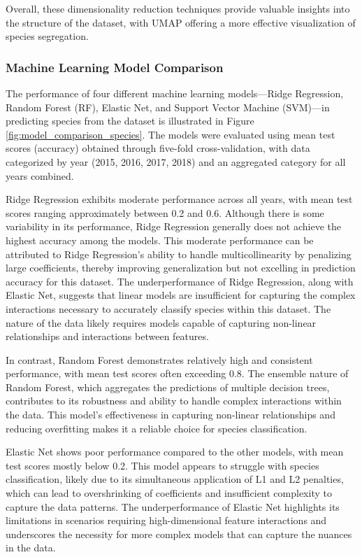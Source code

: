 \documentclass[english,11pt,a4paper,titlepage]{article}
\begin{document}
Overall, these dimensionality reduction techniques provide valuable insights into the structure of the dataset, with UMAP offering a more effective visualization of species segregation.

\subsubsection*{Machine Learning Model Comparison}
The performance of four different machine learning models—Ridge Regression, Random Forest (RF), Elastic Net, and Support Vector Machine (SVM)—in predicting species from the dataset is illustrated in Figure \ref{fig:model_comparison_species}. The models were evaluated using mean test scores (accuracy) obtained through five-fold cross-validation, with data categorized by year (2015, 2016, 2017, 2018) and an aggregated category for all years combined.

Ridge Regression exhibits moderate performance across all years, with mean test scores ranging approximately between 0.2 and 0.6. Although there is some variability in its performance, Ridge Regression generally does not achieve the highest accuracy among the models. This moderate performance can be attributed to Ridge Regression’s ability to handle multicollinearity by penalizing large coefficients, thereby improving generalization but not excelling in prediction accuracy for this dataset. The underperformance of Ridge Regression, along with Elastic Net, suggests that linear models are insufficient for capturing the complex interactions necessary to accurately classify species within this dataset. The nature of the data likely requires models capable of capturing non-linear relationships and interactions between features.

In contrast, Random Forest demonstrates relatively high and consistent performance, with mean test scores often exceeding 0.8. The ensemble nature of Random Forest, which aggregates the predictions of multiple decision trees, contributes to its robustness and ability to handle complex interactions within the data. This model’s effectiveness in capturing non-linear relationships and reducing overfitting makes it a reliable choice for species classification.

Elastic Net shows poor performance compared to the other models, with mean test scores mostly below 0.2. This model appears to struggle with species classification, likely due to its simultaneous application of L1 and L2 penalties, which can lead to overshrinking of coefficients and insufficient complexity to capture the data patterns. The underperformance of Elastic Net highlights its limitations in scenarios requiring high-dimensional feature interactions and underscores the necessity for more complex models that can capture the nuances in the data.
\end{document}
